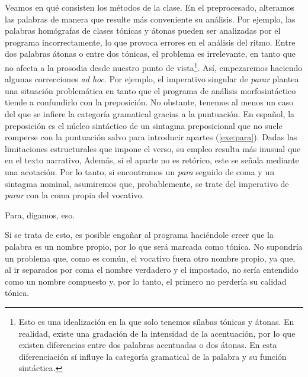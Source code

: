 Veamos en qué consisten los métodos de la clase. En el preprocesado, alteramos las palabras de manera que resulte más conveniente su análisis. Por ejemplo, las palabras homógrafas de clases tónicas y átonas pueden ser analizadas por el programa incorrectamente, lo que provoca errores en el análisis del ritmo. Entre dos palabras átonas o entre dos tónicas, el problema es irrelevante, en tanto que no afecta a la prosodia desde nuestro punto de vista\footnote{Esto es una idealización en la que solo tenemos sílabas tónicas y átonas. En realidad, existe una gradación de la intensidad de la acentuación, por lo que existen diferencias entre dos palabras acentuadas o dos átonas. En esta diferenciación sí influye la categoría gramatical de la palabra y su función sintáctica.}. Así, empezaremos haciendo algunas correcciones \textit{ad hoc}. Por ejemplo, el imperativo singular de \textit{parar} plantea una situación problemática en tanto que el programa de análisis morfosintáctico tiende a confundirlo con la preposición. No obstante, tenemos al menos un caso del que se infiere la categoría gramatical gracias a la puntuación. En español, la preposición es el núcleo sintáctico de un sintagma preposicional que no suele romperse con la puntuación salvo para introducir apartes (\ref{exe:para}). Dadas las limitaciones estructurales que impone el verso, su empleo resulta más inusual que en el texto narrativo, Además, si el aparte no es retórico, este se señala mediante una acotación. Por lo tanto,  si encontramos un \textit{para} seguido de coma y un sintagma nominal, asumiremos que, probablemente, se trate del imperativo de \textit{parar} con la coma propia del vocativo.

\begin{exe}
	\ex\label{exe:para}Para, digamos, eso.
\end{exe} 

Si se trata de esto, es posible engañar al programa haciéndole creer que la palabra es un nombre propio, por lo que será marcada como tónica. No supondría un problema que, como es común, el vocativo fuera otro nombre propio, ya que, al ir separados por coma el nombre verdadero y el impostado, no sería entendido como un nombre compuesto y, por lo tanto, el primero no perdería su calidad tónica.

